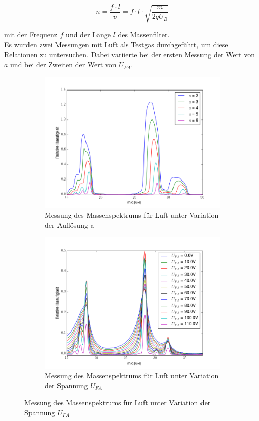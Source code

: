 \begin{equation}
n = \frac{f\cdot l}{v}= f\cdot l \cdot \sqrt{\frac{m}{2qU_B}}
\end{equation}

mit der Frequenz $f$ und der Länge $l$ des Massenfilter.\\
Es wurden zwei Messungen mit Luft als Testgas durchgeführt, um diese Relationen zu untersuchen. Dabei variierte bei der ersten Messung der Wert von $a$ und bei der Zweiten der Wert von $U_{FA}$.

\begin{figure}[h]
\centering
\begin{subfigure}{0.49\textwidth}
\includegraphics[width=\textwidth]{img/VAR}
\caption{Messung des Massenspektrums für Luft unter Variation der Auflösung a}
\end{subfigure}
\begin{subfigure}{0.49\textwidth}
\includegraphics[width=\textwidth]{img/Ufa}
\caption{Messung des Massenspektrums für Luft unter Variation der Spannung $U_{FA}$}
\end{subfigure} 
\end{figure}

